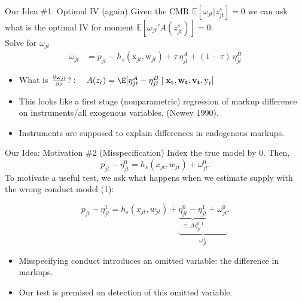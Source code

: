 \begin{frame}{Our Idea \#1: Optimal IV (again)}
Given the CMR $\mathbb{E}[\omega_{jt}  | z_{jt}^s]=0$ we can ask what is the optimal IV for moment $\mathbb{E}[\omega_{jt}' A(z_{jt}^s)]=0$:\\
\vspace{0.25cm}
Solve for $\omega_{jt}$
\begin{align*}
\omega_{jt} &= p_{jt} - h_s(\textrm{x}_{jt},\textrm{w}_{jt}) + \tau\, \eta_{jt}^A + (1-\tau)\,\eta_{jt}^B
\end{align*}
\begin{itemize}
  \item What is $\frac{\partial \omega_{jt}}{\partial \tau}?: \quad A(z_t) = \E[\eta_{jt}^A - \eta_{jt}^B \mid \mathbf{x_t}, \mathbf{w_t}, \mathbf{v_t}, \textrm{y}_t]$
  \item This looks like a \alert{first stage} (nonparametric) regression of markup difference on instruments/all exogenous variables. (Newey 1990).
  \item Instruments are supposed to explain \alert{differences in endogenous markups}. 
\end{itemize}
\end{frame}


\begin{frame}[plain,label=misspecification]{Our Idea: Motivation \#2 (Misspecification)}
Index the \alert{true} model by $0$. Then,
$$ p_{jt} -\eta^0_{jt}= h_s(x_{jt},w_{jt}) + \omega^0_{jt}.$$
To motivate a useful test, we ask what happens when we estimate supply with the \alert{wrong} conduct model (1):

$$p_{jt} -\eta_{jt}^1 = h_s(x_{jt},w_{jt}) + \underbrace{\underbrace{\eta^0_{jt} - \eta^1_{jt}}_{\equiv \Delta \eta_{jt}^{0,1}} +  \omega_{jt}^{0}}_{\omega_{jt}^{1}}.$$
\begin{itemize}
\item Misspecifying conduct introduces an omitted variable: the difference in markups.
\item Our test is premised on detection of this omitted variable.
\end{itemize}
\end{frame}


